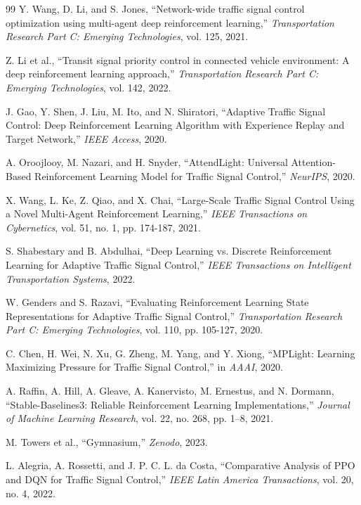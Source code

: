 \documentclass[12pt, a4paper]{report}
\begin{document}
\begin{thebibliography}{99}
 Y. Wang, D. Li, and S. Jones, ``Network-wide traffic signal control optimization using multi-agent deep reinforcement learning,'' \textit{Transportation Research Part C: Emerging Technologies}, vol. 125, 2021.

 Z. Li et al., ``Transit signal priority control in connected vehicle environment: A deep reinforcement learning approach,'' \textit{Transportation Research Part C: Emerging Technologies}, vol. 142, 2022.

 J. Gao, Y. Shen, J. Liu, M. Ito, and N. Shiratori, ``Adaptive Traffic Signal Control: Deep Reinforcement Learning Algorithm with Experience Replay and Target Network,'' \textit{IEEE Access}, 2020.

 A. Oroojlooy, M. Nazari, and H. Snyder, ``AttendLight: Universal Attention-Based Reinforcement Learning Model for Traffic Signal Control,'' \textit{NeurIPS}, 2020.

 X. Wang, L. Ke, Z. Qiao, and X. Chai, ``Large-Scale Traffic Signal Control Using a Novel Multi-Agent Reinforcement Learning,'' \textit{IEEE Transactions on Cybernetics}, vol. 51, no. 1, pp. 174-187, 2021.

 S. Shabestary and B. Abdulhai, ``Deep Learning vs. Discrete Reinforcement Learning for Adaptive Traffic Signal Control,'' \textit{IEEE Transactions on Intelligent Transportation Systems}, 2022.

 W. Genders and S. Razavi, ``Evaluating Reinforcement Learning State Representations for Adaptive Traffic Signal Control,'' \textit{Transportation Research Part C: Emerging Technologies}, vol. 110, pp. 105-127, 2020.

 C. Chen, H. Wei, N. Xu, G. Zheng, M. Yang, and Y. Xiong, ``MPLight: Learning Maximizing Pressure for Traffic Signal Control,'' in \textit{AAAI}, 2020.

 A. Raffin, A. Hill, A. Gleave, A. Kanervisto, M. Ernestus, and N. Dormann, ``Stable-Baselines3: Reliable Reinforcement Learning Implementations,'' \textit{Journal of Machine Learning Research}, vol. 22, no. 268, pp. 1–8, 2021.

 M. Towers et al., ``Gymnasium,'' \textit{Zenodo}, 2023.

 L. Alegria, A. Rossetti, and J. P. C. L. da Costa, ``Comparative Analysis of PPO and DQN for Traffic Signal Control,'' \textit{IEEE Latin America Transactions}, vol. 20, no. 4, 2022.


\end{thebibliography}
\end{document}

